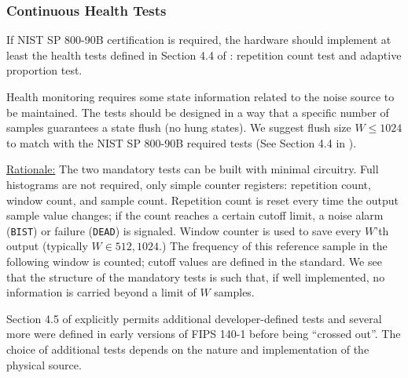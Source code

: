 \subsubsection{Continuous Health Tests}
\label{sec:cont-tests}

    If NIST SP 800-90B certification is required, the hardware
    should implement at least the health tests defined in Section
    4.4 of \cite{TuBaKe+18}: repetition count test and adaptive
    proportion test.

    Health monitoring requires some state information related
    to the noise source to be maintained. The tests should be designed
    in a way that a specific number of samples guarantees a state
    flush (no hung states). We suggest flush size $W \leq 1024$ to
    match with the NIST SP 800-90B required tests (See Section 4.4 in
    \cite{TuBaKe+18}).

    \underline{Rationale:}
    The two mandatory tests can be built with minimal circuitry.
    Full histograms are not required, only simple counter registers:
    repetition count, window count, and sample count.
    Repetition count is reset every time the output sample value
    changes; if the count reaches a certain cutoff limit, a noise alarm
    (\verb|BIST|) or failure (\verb|DEAD|) is signaled.
    Window counter is used to save every $W$'th output (typically
    $W \in { 512, 1024 }$.) The frequency of this
    reference sample in the following window is counted; cutoff values
    are defined in the standard. We see that the structure of the
    mandatory tests is such that, if well implemented, no information is
    carried beyond a limit of $W$ samples.

    Section 4.5 of \cite{TuBaKe+18} explicitly permits additional
    developer-defined tests and several more were defined in early
    versions of FIPS 140-1 before being ``crossed out''. The choice
    of additional tests depends on the nature and implementation of the
    physical source.

